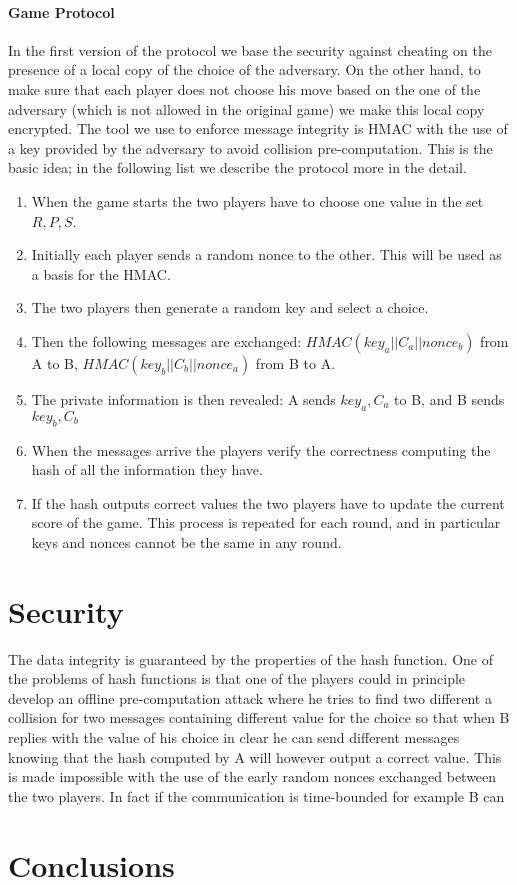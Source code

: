 \documentclass[11pt]{article}
\begin{document}
\paragraph*{Game Protocol}
In the first version of the protocol we base the security against cheating on the presence of a local copy of the choice of the adversary. On the other hand, to make sure that each player does not choose his move based on the one of the adversary (which is not allowed in the original game) we make this local copy encrypted. The tool we use to enforce message integrity is HMAC with the use of a key provided by the adversary to avoid collision pre-computation. This is the basic idea; in the following list we describe the protocol more in the detail.
\begin{enumerate}
\item When the game starts the two players have to choose one value in the set ${R, P, S}$.
\item Initially each player sends a random nonce to the other. This will be used as a basis for the HMAC.
\item The two players then generate a random key and select a choice. 
\item Then the following messages are exchanged: $HMAC(key_a||C_a||nonce_b)$ from A to B, $HMAC(key_b||C_b||nonce_a)$ from B to A.
\item The private information is then revealed: A sends $key_a, C_a$ to B, and B sends $key_b, C_b$
\item When the messages arrive the players verify the correctness computing the hash of all the information they have.
\item If the hash outputs correct values the two players have to update the current score of the game. This process is repeated for each round, and in particular keys and nonces cannot be the same in any round.
\end{enumerate}

\section{Security}
The data integrity is guaranteed by the properties of the hash function. One of the problems of hash functions is that one of the players could in principle develop an offline pre-computation attack where he tries to find two different a collision for two messages containing different value for the choice so that when B replies with the value of his choice in clear he can send different messages knowing that the hash computed by A will however output a correct value. This is made impossible with the use of the early random nonces exchanged between the two players. In fact if the communication is time-bounded for example B can 


\section{Conclusions}

\nocite{*} %
 

\end{document}
